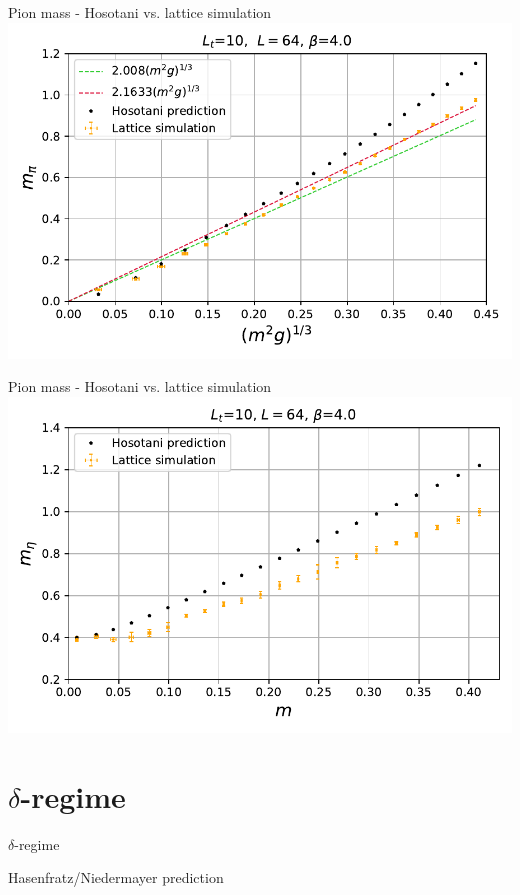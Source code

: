 \documentclass[english]{beamer}
\begin{document}
\begin{frame}{Pion mass - Hosotani vs. lattice simulation}
  \includegraphics[width=1\textwidth]{figs/MPi64x10FiniteT}
\end{frame}

\begin{frame}{Pion mass - Hosotani vs. lattice simulation}
  \includegraphics[width=1\textwidth]{figs/Meta64x10FiniteT}
\end{frame}

\section{$\delta$-regime}

\begin{frame}{$\delta$-regime}
\end{frame}

\begin{frame}{Hasenfratz/Niedermayer prediction}

\end{frame}
\end{document}
